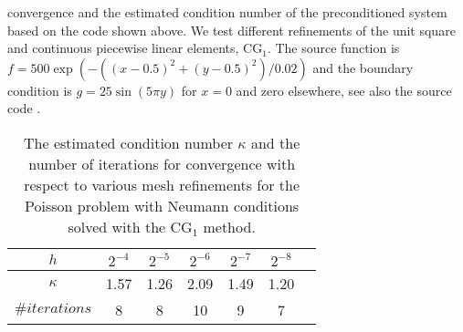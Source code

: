 convergence and the estimated condition number of the preconditioned
system based on the code shown above. We test different
refinements of the unit square and continuous piecewise linear
elements, $\mathrm{CG}_1$. The source function is $f=
500\exp(-((x-0.5)^2 + (y-0.5)^2)/0.02)$ and the boundary condition is
$g = 25 \sin(5\pi y)$ for $x=0$ and zero elsewhere, see also the
source code .
\begin{table}
\begin{center}
\begin{tabular}{|c||c|c|c|c|c|c|}
\hline
$h$ & $2^{-4}$ & $2^{-5}$ & $2^{-6}$ & $2^{-7}$ & $2^{-8}$ \\ \hline
$\kappa$ & 1.57 & 1.26 & 2.09 & 1.49 & 1.20 \\ \hline
$\#iterations$ & 8 & 8 & 10 & 9 & 7 \\ \hline
\end{tabular}
\caption{The estimated condition number $\kappa$ and the number of iterations for
  convergence with respect to various mesh refinements for the Poisson
  problem with Neumann conditions solved with the
  $\mathrm{CG}_1$ method.}\label{tabel:neumann}
\end{center}
\end{table}

